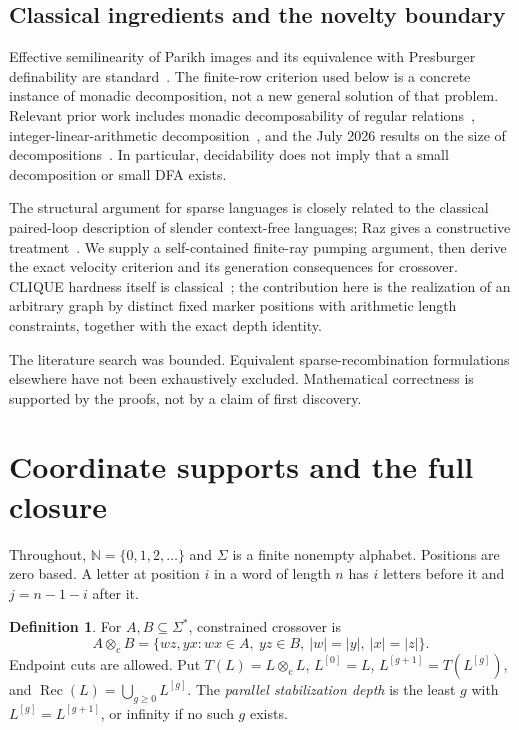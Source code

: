 \documentclass[11pt,letterpaper]{article}
\theoremstyle{definition}
\newtheorem{definition}[theorem]{Definition}
\theoremstyle{remark}
\newcommand{\N}{\mathbb N}
\newcommand{\rec}{\operatorname{Rec}}
\newcommand{\cut}{\otimes_{\mathrm c}}
\newcommand{\gen}[2]{#1^{[#2]}}
\begin{document}
\subsection{Classical ingredients and the novelty boundary}

Effective semilinearity of Parikh images and its equivalence with
Presburger definability are standard~\cite{Parikh,EGKL,GinsburgSpanier}.
The finite-row criterion used below is a concrete instance of monadic
decomposition, not a new general solution of that problem. Relevant prior
work includes monadic decomposability of regular relations~\cite{Barcelo},
integer-linear-arithmetic decomposition~\cite{Hague}, and the July 2026
results on the size of decompositions~\cite{Ganardi}. In particular,
decidability does not imply that a small decomposition or small DFA exists.

The structural argument for sparse languages is closely related to the
classical paired-loop description of slender context-free languages;
Raz gives a constructive treatment~\cite{Raz}. We supply a self-contained
finite-ray pumping argument, then derive the exact velocity criterion and
its generation consequences for crossover. CLIQUE hardness itself is
classical~\cite{Karp}; the contribution here is the realization of an
arbitrary graph by distinct fixed marker positions with arithmetic length
constraints, together with the exact depth identity.

The literature search was bounded. Equivalent sparse-recombination
formulations elsewhere have not been exhaustively excluded. Mathematical
correctness is supported by the proofs, not by a claim of first discovery.

\section{Coordinate supports and the full closure}\label{ccc:cl:sec:supports}

Throughout, $\N=\{0,1,2,\ldots\}$ and $\Sigma$ is a finite nonempty alphabet.
Positions are zero based. A letter at position $i$ in a word of length $n$
has $i$ letters before it and $j=n-1-i$ after it.

\begin{definition}
For $A,B\subseteq\Sigma^*$, constrained crossover is
\[
 A\cut B=\{wz,yx:wx\in A,\ yz\in B,\ |w|=|y|,\ |x|=|z|\}.
\]
Endpoint cuts are allowed. Put $T(L)=L\cut L$, $\gen L0=L$,
$\gen L{g+1}=T(\gen Lg)$, and
$\rec(L)=\bigcup_{g\ge0}\gen Lg$.
The \emph{parallel stabilization depth} is the least $g$ with
$\gen Lg=\gen L{g+1}$, or infinity if no such $g$ exists.
\end{definition}
\end{document}
